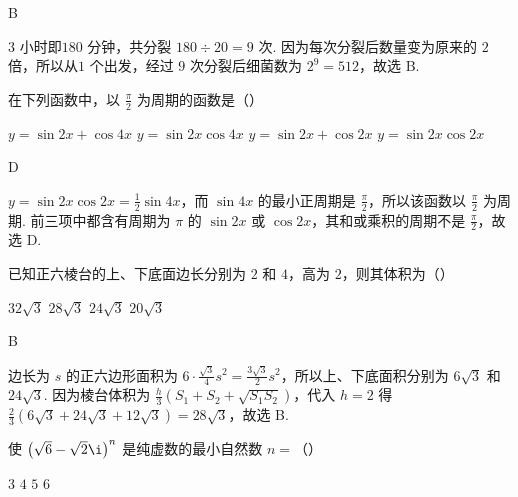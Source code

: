 \begin{answer}
B
\end{answer}

\begin{solution}
\(3\text{ 小时}\)即\(180\text{ 分钟}\)，共分裂 \(180\div 20=9\) 次. 因为每次分裂后数量变为原来的 \(2\) 倍，所以从\(1\text{ 个}\)出发，经过 \(9\) 次分裂后细菌数为 \(2^{9}=512\)，故选 B.
\end{solution}

\begin{problem}
在下列函数中，以 \(\frac{\pi}{2}\) 为周期的函数是（\quad）

\choices
    {\(y=\sin 2x+\cos 4x\)}
    {\(y=\sin 2x\cos 4x\)}
    {\(y=\sin 2x+\cos 2x\)}
    {\(y=\sin 2x\cos 2x\)}
\end{problem}

\begin{answer}
D
\end{answer}

\begin{solution}
\(y=\sin 2x\cos 2x=\frac{1}{2}\sin 4x\)，而 \(\sin 4x\) 的最小正周期是 \(\frac{\pi}{2}\)，所以该函数以 \(\frac{\pi}{2}\) 为周期. 前三项中都含有周期为 \(\pi\) 的 \(\sin 2x\) 或 \(\cos 2x\)，其和或乘积的周期不是 \(\frac{\pi}{2}\)，故选 D.
\end{solution}

\begin{problem}
已知正六棱台的上、下底面边长分别为 \(2\) 和 \(4\)，高为 \(2\)，则其体积为（\quad）

\choices
    {\(32\sqrt{3}\)}
    {\(28\sqrt{3}\)}
    {\(24\sqrt{3}\)}
    {\(20\sqrt{3}\)}
\end{problem}

\begin{answer}
B
\end{answer}

\begin{solution}
边长为 \(s\) 的正六边形面积为 \(6\cdot\frac{\sqrt{3}}{4}s^{2}=\frac{3\sqrt{3}}{2}s^{2}\)，所以上、下底面积分别为 \(6\sqrt{3}\) 和 \(24\sqrt{3}\). 因为棱台体积为 \(\frac{h}{3}\left( S_{1}+S_{2}+\sqrt{S_{1}S_{2}} \right)\)，代入 \(h=2\) 得 \(\frac{2}{3}\left( 6\sqrt{3}+24\sqrt{3}+12\sqrt{3} \right)=28\sqrt{3}\)，故选 B.
\end{solution}

\begin{problem}
使 \(\left( \sqrt{6}-\sqrt{2}\i \right)^{n}\) 是纯虚数的最小自然数 \(n=\)（\quad）

\choices
    {\(3\)}
    {\(4\)}
    {\(5\)}
    {\(6\)}
\end{problem}

